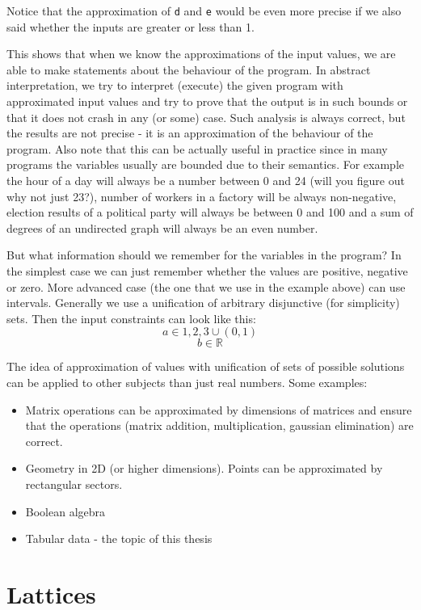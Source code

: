 Notice that the approximation of \verb|d| and \verb|e| would be even more precise if we also said whether the inputs
are greater or less than 1.

This shows that when we know the approximations of the input values, we are able to make statements about the behaviour
of the program.
In abstract interpretation, we try to interpret (execute) the given program with approximated input values and try to
prove that the output is in such bounds or that it does not crash in any (or some) case.
Such analysis is always correct, but the results are not precise - it is an approximation of the behaviour of the program.
Also note that this can be actually useful in practice since in many programs the variables usually are bounded due to
their semantics.
For example the hour of a day will always be a number between 0 and 24 (will you figure out why not just 23?),
number of workers in a factory will be always non-negative, election results of a political party will always be
between 0 and 100 and a sum of degrees of an undirected graph will always be an even number.

But what information should we remember for the variables in the program?
In the simplest case we can just remember whether the values are positive, negative or zero.
More advanced case (the one that we use in the example above) can use intervals.
Generally we use a unification of arbitrary disjunctive (for simplicity) sets.
Then the input constraints can look like this:
\[a \in {1, 2, 3} \cup (0, 1)\]
\[b \in \mathbb{R}\]

The idea of approximation of values with unification of sets of possible solutions can be applied to other subjects than
just real numbers.
Some examples:
\begin{itemize}
    \item Matrix operations can be approximated by dimensions of matrices and ensure that the operations
    (matrix addition, multiplication, gaussian elimination) are correct.

    \item Geometry in 2D (or higher dimensions).
    Points can be approximated by rectangular sectors.

    \item Boolean algebra

    \item Tabular data - the topic of this thesis
\end{itemize}


\section{Lattices} %

